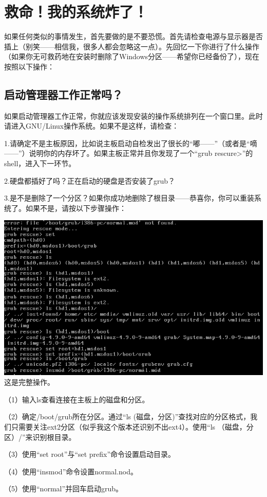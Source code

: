 \documentclass{book}
\begin{document}
\section{救命！我的系统炸了！}
如果任何类似的事情发生，首先要做的是不要恐慌。首先请检查电源与显示器是否插上（别笑——相信我，很多人都会忽略这一点）。先回忆一下你进行了什么操作（如果你无可救药地在安装时删除了Windows分区——希望你已经备份了），现在按照以下操作：
\subsection{启动管理器工作正常吗？}
如果启动管理器工作正常，你就应该发现安装的操作系统排列在一个窗口里。此时请进入GNU/Linux操作系统。如果不是这样，请检查：\par
1.请确定不是主板原因，比如说主板启动自检发出了很长的“嘟——”（或者是“嘀——”）说明你的内存坏了。如果主板正常并且你发现了一个“grub rescure>”的shell，进入下一环节。\par
2.硬盘都插好了吗？正在启动的硬盘是否安装了grub？\par
3.是不是删除了一个分区？如果你成功地删除了根目录——恭喜你，你可以重装系统了。如果不是，请按以下步骤操作：
\begin{center}
	\includegraphics{pic/grubrescure}\\
	这是完整操作。
\end{center}
（1）输入ls查看连接在主板上的磁盘和分区。\par
（2）确定/boot/grub所在分区。通过“ls (磁盘，分区)”查找对应的分区格式，我们只需要关注ext2分区（似乎我这个版本还识别不出ext4）。使用“ls （磁盘，分区）/”来识别根目录。\par
（3）使用“set root”与“set prefix”命令设置启动目录。\par
（4）使用“insmod”命令设置normal.nod。\par
（5）使用“normal”并回车启动grub。
\end{document}

